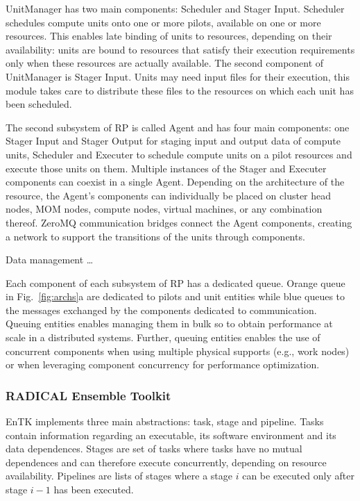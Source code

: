 \documentclass[preprint,12pt, a4paper]{elsarticle}
\begin{document}
UnitManager has two main components: Scheduler and Stager Input. Scheduler
schedules compute units onto one or more pilots, available on one or more
resources. This enables late binding of units to resources, depending on
their availability: units are bound to resources that satisfy their execution
requirements only when these resources are actually available. The second
component of UnitManager is Stager Input. Units may need input files for
their execution, this module takes care to distribute these files to the
resources on which each unit has been scheduled.

The second subsystem of RP is called Agent and has four main components: one
Stager Input and Stager Output for staging input and output data of compute
units, Scheduler and Executer to schedule compute units on a pilot resources
and execute those units on them. Multiple instances of the Stager and
Executer components can coexist in a single Agent. Depending on the
architecture of the resource, the Agent's components can individually be
placed on cluster head nodes, MOM nodes, compute nodes, virtual machines, or
any combination thereof. ZeroMQ communication bridges connect the Agent
components, creating a network to support the transitions of the units
through components.

Data management \ldots{}

Each component of each subsystem of RP has a dedicated queue. Orange queue in
Fig.~\ref{fig:archs}a are dedicated to pilots and unit entities while blue
queues to the messages exchanged by the components dedicated to
communication. Queuing entities enables managing them in bulk so to obtain
performance at scale in a distributed systems. Further, queuing entities
enables the use of concurrent components when using multiple physical
supports (e.g., work nodes) or when leveraging component concurrency for
performance optimization.


\subsubsection{RADICAL Ensemble Toolkit}\label{sssec:arch_entk}

EnTK implements three main abstractions: task, stage and pipeline. Tasks
contain information regarding an executable, its software environment and its
data dependences. Stages are set of tasks where tasks have no mutual
dependences and can therefore execute concurrently, depending on resource
availability. Pipelines are lists of stages where a stage \(i\) can be
executed only after stage \(i-1\) has been executed.
\end{document}
